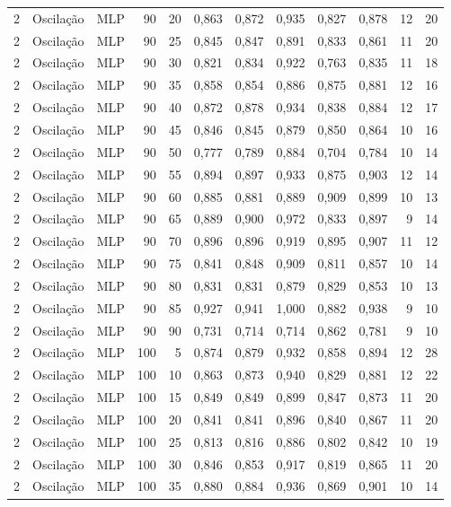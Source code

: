 \begin{longtable}{@{}rllrrrrrrrrr@{}}
2 & Oscilação & MLP & 90 & 20 & 0,863 & 0,872 & 0,935 & 0,827 & 0,878 & 12 & 20 \\
2 & Oscilação & MLP & 90 & 25 & 0,845 & 0,847 & 0,891 & 0,833 & 0,861 & 11 & 20 \\
2 & Oscilação & MLP & 90 & 30 & 0,821 & 0,834 & 0,922 & 0,763 & 0,835 & 11 & 18 \\
2 & Oscilação & MLP & 90 & 35 & 0,858 & 0,854 & 0,886 & 0,875 & 0,881 & 12 & 16 \\
2 & Oscilação & MLP & 90 & 40 & 0,872 & 0,878 & 0,934 & 0,838 & 0,884 & 12 & 17 \\
2 & Oscilação & MLP & 90 & 45 & 0,846 & 0,845 & 0,879 & 0,850 & 0,864 & 10 & 16 \\
2 & Oscilação & MLP & 90 & 50 & 0,777 & 0,789 & 0,884 & 0,704 & 0,784 & 10 & 14 \\
2 & Oscilação & MLP & 90 & 55 & 0,894 & 0,897 & 0,933 & 0,875 & 0,903 & 12 & 14 \\
2 & Oscilação & MLP & 90 & 60 & 0,885 & 0,881 & 0,889 & 0,909 & 0,899 & 10 & 13 \\
2 & Oscilação & MLP & 90 & 65 & 0,889 & 0,900 & 0,972 & 0,833 & 0,897 & 9 & 14 \\
2 & Oscilação & MLP & 90 & 70 & 0,896 & 0,896 & 0,919 & 0,895 & 0,907 & 11 & 12 \\
2 & Oscilação & MLP & 90 & 75 & 0,841 & 0,848 & 0,909 & 0,811 & 0,857 & 10 & 14 \\
2 & Oscilação & MLP & 90 & 80 & 0,831 & 0,831 & 0,879 & 0,829 & 0,853 & 10 & 13 \\
2 & Oscilação & MLP & 90 & 85 & 0,927 & 0,941 & 1,000 & 0,882 & 0,938 & 9 & 10 \\
2 & Oscilação & MLP & 90 & 90 & 0,731 & 0,714 & 0,714 & 0,862 & 0,781 & 9 & 10 \\
2 & Oscilação & MLP & 100 & 5 & 0,874 & 0,879 & 0,932 & 0,858 & 0,894 & 12 & 28 \\
2 & Oscilação & MLP & 100 & 10 & 0,863 & 0,873 & 0,940 & 0,829 & 0,881 & 12 & 22 \\
2 & Oscilação & MLP & 100 & 15 & 0,849 & 0,849 & 0,899 & 0,847 & 0,873 & 11 & 20 \\
2 & Oscilação & MLP & 100 & 20 & 0,841 & 0,841 & 0,896 & 0,840 & 0,867 & 11 & 20 \\
2 & Oscilação & MLP & 100 & 25 & 0,813 & 0,816 & 0,886 & 0,802 & 0,842 & 10 & 19 \\
2 & Oscilação & MLP & 100 & 30 & 0,846 & 0,853 & 0,917 & 0,819 & 0,865 & 11 & 20 \\
2 & Oscilação & MLP & 100 & 35 & 0,880 & 0,884 & 0,936 & 0,869 & 0,901 & 10 & 14 \\

\end{longtable}
